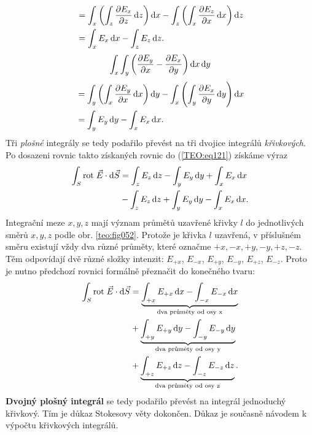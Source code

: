         \begin{align*}
           &= \int_x\left(\int_z\dfrac{\partial E_x}{\partial z}\mathop{}\!\mathrm{d}z\right)\mathop{}\!\mathrm{d}x 
            - \int_z\left(\int_x\dfrac{\partial E_z}{\partial x}\mathop{}\!\mathrm{d}x\right)\mathop{}\!\mathrm{d}z                  \\
           &= \int_xE_x\mathop{}\!\mathrm{d}x - \int_zE_z\mathop{}\!\mathrm{d}z.                              \\
        \end{align*}
        \begin{equation*}
          \int_x\int_y\left(\dfrac{\partial E_y}{\partial x} - \dfrac{\partial E_x}{\partial y}\right)\mathop{}\!\mathrm{d}x\mathop{}\!\mathrm{d}y
        \end{equation*}
        \begin{align*}
           &= \int_y\left(\int_x\dfrac{\partial E_y}{\partial x}\mathop{}\!\mathrm{d}x\right)\mathop{}\!\mathrm{d}y 
            - \int_x\left(\int_y\dfrac{\partial E_x}{\partial y}\mathop{}\!\mathrm{d}y\right)\mathop{}\!\mathrm{d}x                      \\
           &= \int_yE_y\mathop{}\!\mathrm{d}y - \int_xE_x\mathop{}\!\mathrm{d}x.         
        \end{align*}
        Tři \emph{plošné} integrály se tedy podařilo převést na tři dvojice integrálů 
        \emph{křivkových}. Po dosazeni rovnic takto získaných rovnic do (\ref{TEO:eq121}) 
        získáme výraz
        \begin{align*}
          \int_{S}\mathrm{rot}\;\vec{E}\cdot \mathop{}\!\mathrm{d}\vec{S} 
            &= \int_zE_z\mathop{}\!\mathrm{d}z - \int_yE_y\mathop{}\!\mathrm{d}y + \int_xE_x\mathop{}\!\mathrm{d}x                     \\
            &- \int_zE_z\mathop{}\!\mathrm{d}z + \int_yE_y\mathop{}\!\mathrm{d}y - \int_xE_x\mathop{}\!\mathrm{d}x.
        \end{align*}
        Integrační meze \(x, y, z\) mají význam průmětů uzavřené křivky \(l\) do jednotlivých směrů 
        \(x, y, z\) podle obr. \ref{teo:fig052}. Protože je křivka \(l\) 
        uzavřená, v příslušném směru existují vždy dva různé průměty, které označme \(+x, -x, +y, 
        -y, +z, -z\). Těm odpovídají dvě různé složky intenzit: \(E_{+x}\), \(E_{-x}\), \(E_{+y}\), 
        \(E_{-y}\), \(E_{+z}\), \(E_{-z}\). Proto je nutno předchozí rovnici formálně přeznačit do 
        konečného tvaru:
        \begin{align*}
          \int_{S}\mathrm{rot}\;\vec{E}\cdot \mathop{}\!\mathrm{d}\vec{S} 
            &=\underbrace{\int_{+x}E_{+x}\mathop{}\!\mathrm{d}x-\int_{-x}E_{-x}\mathop{}\!\mathrm{d}x}_\text{dva průměty od osy x}\\
            &+\underbrace{\int_{+y}E_{+y}\mathop{}\!\mathrm{d}y-\int_{-y}E_{-y}\mathop{}\!\mathrm{d}y}_\text{dva průměty od osy y}\\ 
            &+\underbrace{\int_{+z}E_{+z}\mathop{}\!\mathrm{d}z-\int_{-z}E_{-z}\mathop{}\!\mathrm{d}z}_\text{dva průměty od osy z}.
        \end{align*}
        \textbf{Dvojný plošný integrál} se tedy podařilo převést na integrál jednoduchý křivkový. 
        Tím je důkaz Stokesovy věty dokončen. Důkaz je současně návodem k výpočtu křivkových 
        integrálů.
        
